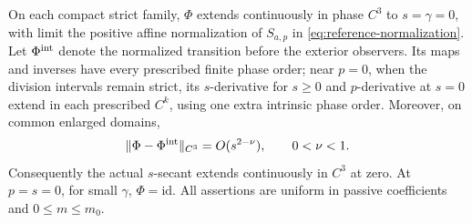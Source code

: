 \begin{proposition}
\label{prop:source-normalization}
\label{ann:prop-source-curvature-persistence}
On each compact strict family, \(\Phi\) extends continuously in
phase \(C^3\) to \(s=\gamma=0\), with limit the positive affine
normalization of \(S_{a,p}\) in \eqref{eq:reference-normalization}.
Let \(\Phi^{\rm int}\) denote the normalized transition before the
exterior observers. Its maps and inverses have every prescribed finite
phase order; near \(p=0\), when the division intervals remain strict,
its \(s\)-derivative for \(s\ge0\) and \(p\)-derivative at \(s=0\)
extend in each prescribed \(C^k\), using one extra intrinsic phase
order. Moreover, on common enlarged domains,
\[
 \|\Phi-\Phi^{\rm int}\|_{C^3}=O(s^{2-\nu}),\qquad 0<\nu<1.
\]
Consequently the actual \(s\)-secant extends continuously in
\(C^3\) at zero. At \(p=s=0\), for small \(\gamma\),
\(\Phi=\mathrm{id}\). All assertions are uniform in passive
coefficients and \(0\le m\le m_0\).
\end{proposition}

